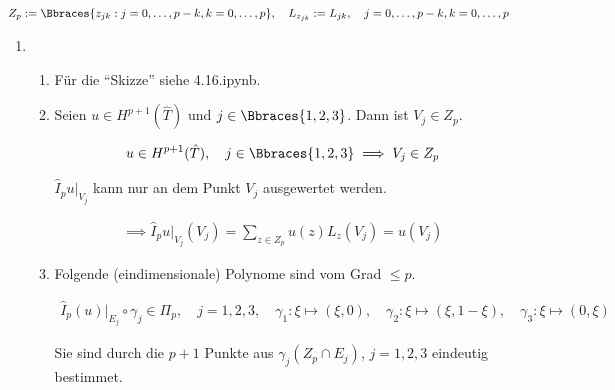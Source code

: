 
  \begin{solution}

  \begin{align*}
    Z_p
    :=
    \Bbraces{z_{jk}: j = 0, \dots, p - k, k = 0, \dots, p},
    \quad
    L_{z_{jk}}
    :=
    L_{jk},
    \quad
    j = 0, \dots, p - k, k = 0, \dots, p
  \end{align*}

  \begin{enumerate}[label = \textbf{\alph*)}]

    \item

    \begin{enumerate}[label = (\roman*)]

      \item Für die \enquote{Skizze} siehe 4.16.ipynb.

      \item Seien $u \in H^{p+1}(\hat T)$ und $j \in \Bbraces{1, 2, 3}$.
      Dann ist $V_j \in Z_p$.

      \begin{align*}
        u \in H^{p+1}(\hat T),
        \quad
        j \in \Bbraces{1, 2, 3}
        \implies
        V_j \in Z_p
      \end{align*}

      $\hat I_p u|_{V_j}$ kann nur an dem Punkt $V_j$ ausgewertet werden.

      \begin{align*}
        \implies
        \hat I_p u|_{V_j}(V_j)
        =
        \sum_{z \in Z_p}
        u(z) L_z(V_j)
        =
        u(V_j)
      \end{align*}

      \item Folgende (eindimensionale) Polynome sind vom Grad $\leq p$.

      \begin{align*}
        \hat I_p(u)|_{E_j} \circ \gamma_j \in \Pi_p,
        \quad
        j = 1, 2, 3,
        \quad
        \gamma_1: \xi \mapsto (\xi, 0),
        \quad
        \gamma_2: \xi \mapsto (\xi, 1 - \xi),
        \quad
        \gamma_3: \xi \mapsto (0, \xi)
      \end{align*}

      Sie sind durch die $p + 1$ Punkte aus $\gamma_j(Z_p \cap E_j)$, $j = 1, 2, 3$ eindeutig bestimmet.


\end{enumerate}
\end{enumerate}
\end{solution}
